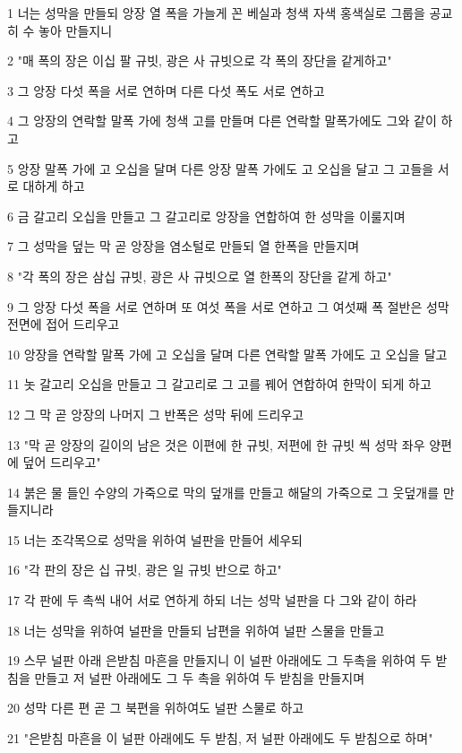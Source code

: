 \par 1 너는 성막을 만들되 앙장 열 폭을 가늘게 꼰 베실과 청색 자색 홍색실로 그룹을 공교히 수 놓아 만들지니
\par 2 "매 폭의 장은 이십 팔 규빗, 광은 사 규빗으로 각 폭의 장단을 같게하고"
\par 3 그 앙장 다섯 폭을 서로 연하며 다른 다섯 폭도 서로 연하고
\par 4 그 앙장의 연락할 말폭 가에 청색 고를 만들며 다른 연락할 말폭가에도 그와 같이 하고
\par 5 앙장 말폭 가에 고 오십을 달며 다른 앙장 말폭 가에도 고 오십을 달고 그 고들을 서로 대하게 하고
\par 6 금 갈고리 오십을 만들고 그 갈고리로 앙장을 연합하여 한 성막을 이룰지며
\par 7 그 성막을 덮는 막 곧 앙장을 염소털로 만들되 열 한폭을 만들지며
\par 8 "각 폭의 장은 삼십 규빗, 광은 사 규빗으로 열 한폭의 장단을 같게 하고"
\par 9 그 앙장 다섯 폭을 서로 연하며 또 여섯 폭을 서로 연하고 그 여섯째 폭 절반은 성막 전면에 접어 드리우고
\par 10 앙장을 연락할 말폭 가에 고 오십을 달며 다른 연락할 말폭 가에도 고 오십을 달고
\par 11 놋 갈고리 오십을 만들고 그 갈고리로 그 고를 꿰어 연합하여 한막이 되게 하고
\par 12 그 막 곧 앙장의 나머지 그 반폭은 성막 뒤에 드리우고
\par 13 "막 곧 앙장의 길이의 남은 것은 이편에 한 규빗, 저편에 한 규빗 씩 성막 좌우 양편에 덮어 드리우고"
\par 14 붉은 물 들인 수양의 가죽으로 막의 덮개를 만들고 해달의 가죽으로 그 웃덮개를 만들지니라
\par 15 너는 조각목으로 성막을 위하여 널판을 만들어 세우되
\par 16 "각 판의 장은 십 규빗, 광은 일 규빗 반으로 하고"
\par 17 각 판에 두 촉씩 내어 서로 연하게 하되 너는 성막 널판을 다 그와 같이 하라
\par 18 너는 성막을 위하여 널판을 만들되 남편을 위하여 널판 스물을 만들고
\par 19 스무 널판 아래 은받침 마흔을 만들지니 이 널판 아래에도 그 두촉을 위하여 두 받침을 만들고 저 널판 아래에도 그 두 촉을 위하여 두 받침을 만들지며
\par 20 성막 다른 편 곧 그 북편을 위하여도 널판 스물로 하고
\par 21 "은받침 마흔을 이 널판 아래에도 두 받침, 저 널판 아래에도 두 받침으로 하며"
